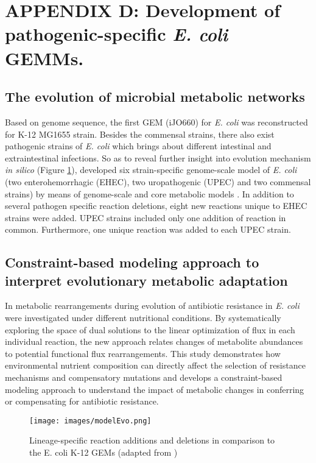 \documentclass{article}
\begin{document}
\section{APPENDIX D: Development of pathogenic-specific {\it E. coli} GEMMs.}

\subsection{The evolution of microbial metabolic networks}

Based on genome sequence, the first GEM (iJO660) for {\it E. coli} was reconstructed for K-12 MG1655 strain. Besides the commensal strains, there also exist pathogenic strains of {\it E. coli} which brings about different intestinal and extraintestinal infections. So as to reveal further insight into evolution mechanism {\it in silico} (Figure \ref{fig:modevo}), developed six strain-specific genome-scale model of {\it E. coli} (two enterohemorrhagic (EHEC), two uropathogenic (UPEC) and two commensal strains) by means of genome-scale and core metabolic models \cite{Baumler}. In addition to several pathogen specific reaction deletions, eight new reactions unique to EHEC strains were added. UPEC strains included only one addition of reaction in common. Furthermore, one unique reaction was added to each UPEC strain.

\subsection{Constraint-based modeling approach to interpret evolutionary metabolic adaptation}

In \cite{Zampieri} metabolic rearrangements during evolution of antibiotic resistance in {\it E. coli} were investigated under different nutritional conditions. By systematically exploring the space of dual solutions to the linear optimization of flux in each individual reaction, the new approach relates changes of metabolite abundances to potential functional flux rearrangements. This study demonstrates how environmental nutrient composition can directly affect the selection of resistance mechanisms and compensatory mutations and develops a constraint-based modeling approach to understand the impact of metabolic changes in conferring or compensating for antibiotic resistance.

\begin{figure}
\centering
\texttt{[image: images/modelEvo.png]}
\caption{\label{fig:modevo} Lineage-specific reaction additions and deletions in comparison to the E. coli K-12 GEMs (adapted from \cite{Baumler})}
\end{figure}



\end{document}
